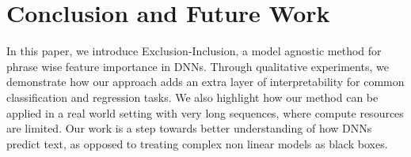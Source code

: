 \documentclass[11pt]{article}
\begin{document}
\section{Conclusion and Future Work}

In this paper, we introduce Exclusion-Inclusion, a model agnostic method for phrase wise feature importance in DNNs. Through qualitative experiments, we demonstrate how our approach adds an extra layer of interpretability for common classification and regression tasks. We also highlight how our method can be applied in a real world setting with very long sequences, where compute resources are limited. Our work is a step towards better understanding of how DNNs predict text, as opposed to treating complex non linear models as black boxes.





\nocite{*}











\end{document}
